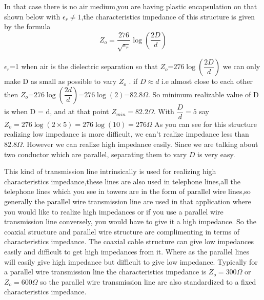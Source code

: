 In that case there is no air medium,you are having plastic encapsulation on that shown below with  $\epsilon_r\neq1$,the characteristics impedance of this structure is given by the formula 
\begin{equation*}
Z_o=\dfrac{276}{\sqrt{\epsilon_r}}\log(\dfrac{2D}{d})
\end{equation*}

$\epsilon_r$=1 when air is the dielectric separation so that $Z_o$=$276\log(\dfrac{2D}{d})$ we can only make D as small as possible to vary $Z_o$ . if $D\approx d$ i.e almost close to each other then $Z_o$=$276\log(\dfrac{2d}{d})$=$276\log(2)$=$82.8\Omega$. So minimum realizable value of D is when D = d, and at that point $Z_{min}=82.2\Omega$. With $\dfrac{D}{d}=5$ say $Z_o=276\log(2\times5)=276\log(10)=276\Omega$ As you can see for this structure realizing low impedance is more difficult, we can't realize impedance less than $82.8\Omega$. However we can realize high impedance easily. Since we are talking about two conductor which are parallel, separating them to vary $D$ is very easy.

This kind of transmission line intrinsically is used for realizing high characteristics impedance,these lines are also used in telephone lines,all the telephone lines which you see in towers are in the form of parallel wire lines,so generally the parallel wire transmission line are used in that application where you would like to realize high impedances or if you use a parallel wire transmission line conversely, you would have to give it a high impedance. So the coaxial structure and parallel wire structure are complimenting in terms of characteristics impedance. The coaxial cable structure can give low impedances easily and difficult to get high impedances from it. Where as the parallel lines will easily give high impedance but difficult to give low impedance. Typically for a parallel wire transmission line the characteristics impedance is $Z_o=300\Omega$ or $Z_o=600\Omega$ so the parallel wire transmission line are also standardized to a fixed characteristics impedance.

